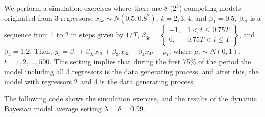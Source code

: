 We perform a simulation exercises where there are 8 ($2^3$) competing models originated from 3 regressors, $x_{tk}\sim N(0.5,0.8^2)$, $k=2,3,4$, and $\beta_1=0.5$, $\beta_{2t}$ is a sequence from 1 to 2 in steps given by $1/T$, $\beta_{3t}=\begin{Bmatrix}
	-1, & 1<t\leq 0.75T\\
	0, & 0.75T< t \leq T
\end{Bmatrix}$, and $\beta_4=1.2$. Then, $y_t=\beta_1+\beta_{2t}x_{2t}+\beta_{3t}x_{3t}+\beta_{4}x_{4t}+\mu_t$, where $\mu_t\sim N(0,1)$, $t=1,2,\dots,500$. This setting implies that during the first 75\% of the period the model including all 3 regressors is the data generating process, and after this, the model with regressors 2 and 4 is the data generating process.

The following code shows the simulation exercise, and the results of the dynamic Bayesian model average setting $\lambda=\delta=0.99$.

